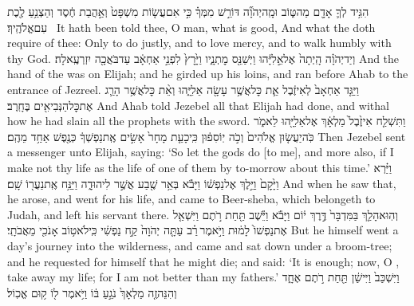 {הִגִּ֥יד לְךָ֛ אָדָ֖ם מַה\maqqaf טּ֑וֹב וּמָֽה\maqqaf יְהֹוָ֞ה דּוֹרֵ֣שׁ מִמְּךָ֗ כִּ֣י אִם\maqqaf עֲשׂ֤וֹת מִשְׁפָּט֙ וְאַ֣הֲבַת חֶ֔סֶד וְהַצְנֵ֥עַ לֶ֖כֶת עִם\maqqaf אֱלֹהֶֽיךָ׃ \setuma }
{It hath been told thee, O man, what is good, And what the \lord\space doth require of thee: Only to do justly, and to love mercy, and to walk humbly with thy God.}
\newperek
{}
\label{haft_41}
\setcounter{chap}{18}
\setcounter{verse}{46}
{וְיַד\maqqaf יְהֹוָ֗ה הָֽיְתָה֙ אֶל\maqqaf אֵ֣לִיָּ֔הוּ וַיְשַׁנֵּ֖ס מׇתְנָ֑יו וַיָּ֙רׇץ֙ לִפְנֵ֣י אַחְאָ֔ב עַד\maqqaf בֹּאֲכָ֖ה יִזְרְעֶֽאלָה׃}
{And the hand of the \lord\space was on Elijah; and he girded up his loins, and ran before Ahab to the entrance of Jezreel.}
\newperek
{}
{וַיַּגֵּ֤ד אַחְאָב֙ לְאִיזֶ֔בֶל אֵ֛ת כׇּל\maqqaf אֲשֶׁ֥ר עָשָׂ֖ה אֵלִיָּ֑הוּ וְאֵ֨ת כׇּל\maqqaf אֲשֶׁ֥ר הָרַ֛ג אֶת\maqqaf כׇּל\maqqaf הַנְּבִיאִ֖ים בֶּחָֽרֶב׃}
{And Ahab told Jezebel all that Elijah had done, and withal how he had slain all the prophets with the sword.}
{וַתִּשְׁלַ֤ח אִיזֶ֙בֶל֙ מַלְאָ֔ךְ אֶל\maqqaf אֵלִיָּ֖הוּ לֵאמֹ֑ר כֹּֽה\maqqaf יַעֲשׂ֤וּן אֱלֹהִים֙ וְכֹ֣ה יֽוֹסִפ֔וּן כִּֽי\maqqaf כָעֵ֤ת מָחָר֙ אָשִׂ֣ים אֶֽת\maqqaf נַפְשְׁךָ֔ כְּנֶ֖פֶשׁ אַחַ֥ד מֵהֶֽם׃}
{Then Jezebel sent a messenger unto Elijah, saying: ‘So let the gods do [to me], and more also, if I make not thy life as the life of one of them by to-morrow about this time.’}
{וַיַּ֗רְא וַיָּ֙קׇם֙ וַיֵּ֣לֶךְ אֶל\maqqaf נַפְשׁ֔וֹ וַיָּבֹ֕א בְּאֵ֥ר שֶׁ֖בַע אֲשֶׁ֣ר לִיהוּדָ֑ה וַיַּנַּ֥ח אֶֽת\maqqaf נַעֲר֖וֹ שָֽׁם׃}
{And when he saw that, he arose, and went for his life, and came to Beer-sheba, which belongeth to Judah, and left his servant there.}
{וְהֽוּא\maqqaf הָלַ֤ךְ בַּמִּדְבָּר֙ דֶּ֣רֶךְ י֔וֹם וַיָּבֹ֕א וַיֵּ֕שֶׁב תַּ֖חַת רֹ֣תֶם  וַיִּשְׁאַ֤ל אֶת\maqqaf נַפְשׁוֹ֙ לָמ֔וּת וַיֹּ֣אמֶר \legarmeh  רַ֗ב עַתָּ֤ה יְהֹוָה֙ קַ֣ח נַפְשִׁ֔י כִּֽי\maqqaf לֹא\maqqaf ט֥וֹב אָנֹכִ֖י מֵאֲבֹתָֽי׃}
{But he himself went a day’s journey into the wilderness, and came and sat down under a broom-tree; and he requested for himself that he might die; and said: ‘It is enough; now, O \lord, take away my life; for I am not better than my fathers.’}
{וַיִּשְׁכַּב֙ וַיִּישַׁ֔ן תַּ֖חַת רֹ֣תֶם אֶחָ֑ד וְהִנֵּה\maqqaf זֶ֤ה מַלְאָךְ֙ נֹגֵ֣עַ בּ֔וֹ וַיֹּ֥אמֶר ל֖וֹ ק֥וּם אֱכֽוֹל׃}
